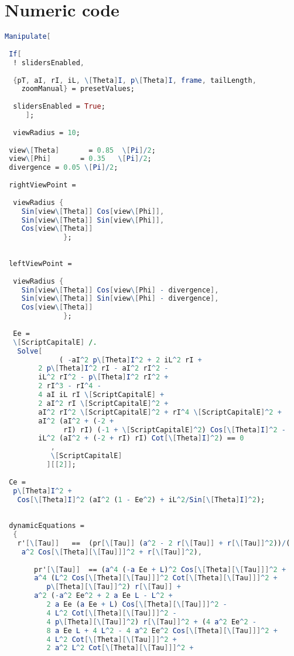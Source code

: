 \chapter{Numeric code}

\begin{lstlisting}[language=Mathematica,stepnumber=1,]
Manipulate[
 
 If[
  ! slidersEnabled,
    
  {pT, aI, rI, iL, \[Theta]I, p\[Theta]I, frame, tailLength, 
    zoomManual} = presetValues;
  
  slidersEnabled = True;
     ];
 
  viewRadius = 10;   
 
 view\[Theta]       = 0.85  \[Pi]/2;
 view\[Phi]       = 0.35   \[Pi]/2;
 divergence = 0.05 \[Pi]/2;
 
 rightViewPoint = 
  
  viewRadius {
    Sin[view\[Theta]] Cos[view\[Phi]],
    Sin[view\[Theta]] Sin[view\[Phi]],
    Cos[view\[Theta]]
              };
 
 
 leftViewPoint = 
  
  viewRadius {
    Sin[view\[Theta]] Cos[view\[Phi] - divergence],
    Sin[view\[Theta]] Sin[view\[Phi] - divergence],
    Cos[view\[Theta]]
              };
 
  Ee =
  \[ScriptCapitalE] /.
   Solve[
             ( -aI^2 p\[Theta]I^2 + 2 iL^2 rI +
        2 p\[Theta]I^2 rI - aI^2 rI^2 -
        iL^2 rI^2 - p\[Theta]I^2 rI^2 +
        2 rI^3 - rI^4 -
        4 aI iL rI \[ScriptCapitalE] + 
        2 aI^2 rI \[ScriptCapitalE]^2 +
        aI^2 rI^2 \[ScriptCapitalE]^2 + rI^4 \[ScriptCapitalE]^2 +
        aI^2 (aI^2 + (-2 + 
              rI) rI) (-1 + \[ScriptCapitalE]^2) Cos[\[Theta]I]^2 -
        iL^2 (aI^2 + (-2 + rI) rI) Cot[\[Theta]I]^2) == 0
           ,
           \[ScriptCapitalE]
          ][[2]];
 
 Ce =
  p\[Theta]I^2 + 
   Cos[\[Theta]I]^2 (aI^2 (1 - Ee^2) + iL^2/Sin[\[Theta]I]^2);
 
 
 dynamicEquations =
  {
   r'[\[Tau]]   ==  (pr[\[Tau]] (a^2 - 2 r[\[Tau]] + r[\[Tau]]^2))/(
    a^2 Cos[\[Theta][\[Tau]]]^2 + r[\[Tau]]^2),
   
       pr'[\[Tau]]  == (a^4 (-a Ee + L)^2 Cos[\[Theta][\[Tau]]]^2 + 
       a^4 (L^2 Cos[\[Theta][\[Tau]]]^2 Cot[\[Theta][\[Tau]]]^2 + 
          p\[Theta][\[Tau]]^2) r[\[Tau]] + 
       a^2 (-a^2 Ee^2 + 2 a Ee L - L^2 + 
          2 a Ee (a Ee + L) Cos[\[Theta][\[Tau]]]^2 - 
          4 L^2 Cot[\[Theta][\[Tau]]]^2 - 
          4 p\[Theta][\[Tau]]^2) r[\[Tau]]^2 + (4 a^2 Ee^2 - 
          8 a Ee L + 4 L^2 - 4 a^2 Ee^2 Cos[\[Theta][\[Tau]]]^2 + 
          4 L^2 Cot[\[Theta][\[Tau]]]^2 + 
          2 a^2 L^2 Cot[\[Theta][\[Tau]]]^2 + 
          

\end{lstlisting}
